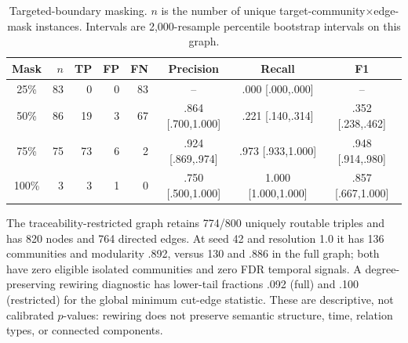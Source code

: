 \documentclass[runningheads]{llncs}
\begin{document}
\begin{table}[h]
\caption{Louvain robustness across 100 seeds per resolution and graph variant. Every cell has zero eligible isolated communities in 100/100 seeds. Communities and modularity are median [minimum--maximum].}
\centering\scriptsize
{}
\end{table}

\begin{table}[h]
\caption{Targeted-boundary masking. $n$ is the number of unique target-community$\times$edge-mask instances. Intervals are 2,000-resample percentile bootstrap intervals on this graph.}
\centering\scriptsize
\begin{tabular}{crrrrccc}
\toprule
Mask & $n$ & TP & FP & FN & Precision & Recall & F1\\
\midrule
25\% & 83 & 0 & 0 & 83 & -- & .000 [.000,.000] & --\\
50\% & 86 & 19 & 3 & 67 & .864 [.700,1.000] & .221 [.140,.314] & .352 [.238,.462]\\
75\% & 75 & 73 & 6 & 2 & .924 [.869,.974] & .973 [.933,1.000] & .948 [.914,.980]\\
100\% & 3 & 3 & 1 & 0 & .750 [.500,1.000] & 1.000 [1.000,1.000] & .857 [.667,1.000]\\
\bottomrule
\end{tabular}
\end{table}

The traceability-restricted graph retains 774/800 uniquely routable triples and has 820 nodes and 764 directed edges. At seed 42 and resolution 1.0 it has 136 communities and modularity .892, versus 130 and .886 in the full graph; both have zero eligible isolated communities and zero FDR temporal signals. A degree-preserving rewiring diagnostic has lower-tail fractions .092 (full) and .100 (restricted) for the global minimum cut-edge statistic. These are descriptive, not calibrated $p$-values: rewiring does not preserve semantic structure, time, relation types, or connected components.
\end{document}
